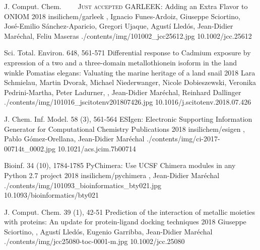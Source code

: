 \begin{cventries}

  \pubentry
    {J. Comput. Chem.~~\cdot~~ \scshape{Just accepted}} %
    {GARLEEK: Adding an Extra Flavor to ONIOM} %
    {2018} %
    {insilichem/garleek} %
    {, Ignacio Funes-Ardoiz, Giuseppe Sciortino, José-Emilio Sánchez-Aparicio, Gregori Ujaque, Agustí Lledós, Jean-Didier Maréchal, Feliu Maseras} %
    {./contents/img/101002_jcc25612.jpg} %
    {10.1002/jcc.25612} %

  \pubentry
    {Sci. Total. Environ. 648, 561-571} %
    {Differential response to Cadmium exposure by expression of a two and a three-domain metallothionein isoform in the land winkle Pomatias elegans: Valuating the marine heritage of a land snail} %
    {2018} %
    {} %
    {Lara Schmielau, Martin Dvorak, Michael Niederwanger, Nicole Dobieszewski, Veronika Pedrini-Martha, Peter Ladurner, , Jean-Didier Maréchal, Reinhard Dallinger} %
    {./contents/img/101016_jscitotenv201807426.jpg} %
    {10.1016/j.scitotenv.2018.07.426} %

  \pubentry
    {J. Chem. Inf. Model. 58 (3), 561-564} %
    {ESIgen: Electronic Supporting Information Generator for Computational Chemistry Publications} %
    {2018} %
    {insilichem/esigen} %
    {,\textsuperscript{\dagger} Pablo Gómez-Orellana, Jean-Didier Maréchal\textsuperscript{\dagger}} %
    {./contents/img/ci-2017-00714t_0002.jpg} %
    {10.1021/acs.jcim.7b00714} %

  \pubentry
    {Bioinf. 34 (10), 1784-1785} %
    {PyChimera: Use UCSF Chimera modules in any Python 2.7 project} %
    {2018} %
    {insilichem/pychimera} %
    {,\textsuperscript{\dagger} Jean-Didier Maréchal\textsuperscript{\dagger}} %
    {./contents/img/101093_bioinformatics_bty021.jpg} %
    {10.1093/bioinformatics/bty021} %

  \pubentry
    {J. Comput. Chem. 39 (1), 42-51} %
    {Prediction of the interaction of metallic moieties with proteins: An update for protein-ligand docking techniques} %
    {2018} %
    {} %
    {Giuseppe Sciortino, , Agustí Lledós, Eugenio Garribba, Jean-Didier Maréchal} %
    {./contents/img/jcc25080-toc-0001-m.jpg} %
    {10.1002/jcc.25080} %


\end{cventries}
